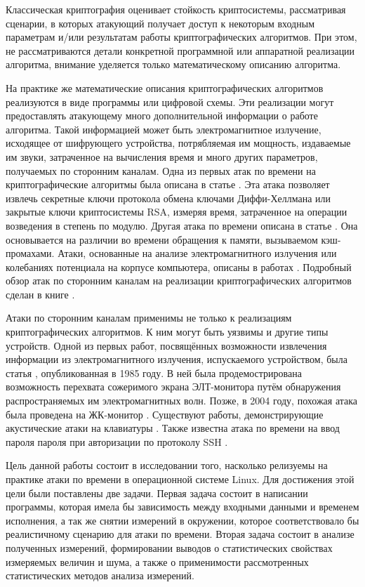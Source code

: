 
Классическая криптография оценивает стойкость криптосистемы, рассматривая
сценарии, в которых атакующий получает доступ к некоторым входным параметрам
и/или результатам работы криптографических алгоритмов. При этом, не
рассматриваются детали конкретной программной или аппаратной реализации
алгоритма, внимание уделяется только математическому описанию алгоритма.

На практике же математические описания криптографических алгоритмов реализуются
в виде программы или цифровой схемы. Эти реализации могут предоставлять
атакующему много дополнительной информации о работе алгоритма. Такой информацией
может быть электромагнитное излучение, исходящее от шифрующего устройства,
потрябляемая им мощность, издаваемые им звуки, затраченное на вычисления время и
много других параметров, получаемых по сторонним каналам. Одна из первых атак по
времени на криптографические алгоритмы была описана в статье \cite{kocher}. Эта
атака позволяет извлечь секретные ключи протокола обмена ключами Диффи-Хеллмана
или закрытые ключи криптосистемы RSA, измеряя время, затраченное на операции
возведения в степень по модулю. Другая атака по времени описана в статье
\cite{bernstein}. Она основывается на различии во времени обращения к памяти,
вызываемом кэш-промахами. Атаки, основанные на анализе электромагнитного
излучения или колебаниях потенциала на корпусе компьютера, описаны в работах
\cite{hands} \cite{em}. Подробный обзор атак по сторонним каналам на реализации
криптографических алгоритмов сделан в книге \cite{cren}.

Атаки по сторонним каналам применимы не только к реализациям криптографических
алгоритмов. К ним могут быть уязвимы и другие типы устройств. Одной из первых
работ, посвящённых возможности извлечения информации из электромагнитного
излучения, испускаемого устройством, была статья \cite{van-eck}, опубликованная
в 1985 году. В ней была продемострирована возможность перехвата сожеримого
экрана ЭЛТ-монитора путём обнаружения распространяемых им электромагнитных волн.
Позже, в 2004 году, похожая атака была проведена на ЖК-монитор \cite{kuhn}.
Существуют работы, демонстрирующие акустические атаки на клавиатуры
\cite{asonov} \cite{zhuang}. Также известна атака по времени на ввод пароля пароля
при авторизации по протоколу SSH \cite{ssh}.

Цель данной работы состоит в исследовании того, насколько релизуемы на практике
атаки по времени в операционной системе Linux. Для достижения этой цели были
поставлены две задачи. Первая задача состоит в написании программы, которая
имела бы зависимость между входными данными и временем исполнения, а так же
снятии измерений в окружении, которое соответствовало бы реалистичному сценарию
для атаки по времени. Вторая задача состоит в анализе полученных измерений,
формировании выводов о статистических свойствах измеряемых величин и шума, а
также о применимости рассмотренных статистических методов анализа измерений.

\clearpage
